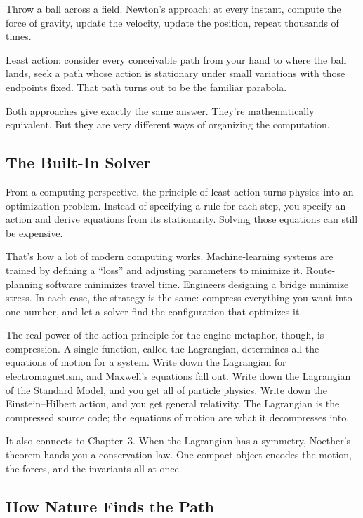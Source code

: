\begin{examplebox}
Throw a ball across a field. Newton's approach: at every instant, compute the force of gravity, update the velocity, update the position, repeat thousands of times.

Least action: consider every conceivable path from your hand to where the ball lands, seek a path whose action is stationary under small variations with those endpoints fixed. That path turns out to be the familiar parabola.

Both approaches give exactly the same answer. They're mathematically equivalent. But they are very different ways of organizing the computation.
\end{examplebox}

\subsection{The Built-In Solver}

From a computing perspective, the principle of least action turns physics into an optimization problem. Instead of specifying a rule for each step, you specify an action and derive equations from its stationarity. Solving those equations can still be expensive.

That's how a lot of modern computing works. Machine-learning systems are trained by defining a ``loss'' and adjusting parameters to minimize it. Route-planning software minimizes travel time. Engineers designing a bridge minimize stress. In each case, the strategy is the same: compress everything you want into one number, and let a solver find the configuration that optimizes it.

The real power of the action principle for the engine metaphor, though, is compression. A single function, called the Lagrangian, determines all the equations of motion for a system. Write down the Lagrangian for electromagnetism, and Maxwell's equations fall out. Write down the Lagrangian of the Standard Model, and you get all of particle physics. Write down the Einstein--Hilbert action, and you get general relativity. The Lagrangian is the compressed source code; the equations of motion are what it decompresses into.

It also connects to Chapter~3. When the Lagrangian has a symmetry, Noether's theorem hands you a conservation law. One compact object encodes the motion, the forces, and the invariants all at once.

\subsection{How Nature Finds the Path}

